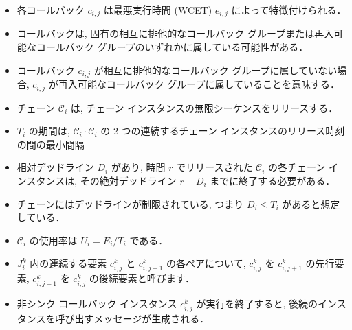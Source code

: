 \begin{frame}{}
    \begin{itemize}
        \item 各コールバック $c_{i, j}$ は最悪実行時間 (WCET) $e_{i, j}$ によって特徴付けられる．
        \item コールバックは, 固有の相互に排他的なコールバック グループまたは再入可能なコールバック グループのいずれかに属している可能性がある．
        \item コールバック $c_{i, j}$ が相互に排他的なコールバック グループに属していない場合, $c_{i, j}$ が再入可能なコールバック グループに属していることを意味する．
    \end{itemize}
\end{frame}

\begin{frame}{}
    \begin{itemize}
        \item チェーン $\mathcal{C}_{i}$ は, チェーン インスタンスの無限シーケンスをリリースする．
        \item $T_{i}$ の期間は, $\mathcal{C}_{i} \cdot \mathcal{C}_{i}$ の 2 つの連続するチェーン インスタンスのリリース時刻の間の最小間隔
        \item 相対デッドライン $D_{i}$ があり, 時間 $r$ でリリースされた $\mathcal{C}_{i}$ の各チェーン インスタンスは, その絶対デッドライン $r+D_{i}$ までに終了する必要がある．
        \item チェーンにはデッドラインが制限されている, つまり $D_{i} \leq T_{i}$ があると想定している．
        \item $\mathcal{C}_{i}$ の使用率は $U_{i}=E_{i} / T_{i}$ である．
    \end{itemize}
\end{frame}

\begin{frame}{}
    \begin{itemize}
        \item $J_{i}^{k}$ 内の連続する要素 $c_{i, j}^{k}$ と $c_{i, j+1}^{k}$ の各ペアについて, $c_{i, j}^{k}$ を $c_{i, j+1}^{k}$ の先行要素, $c_{i, j+1}^{k}$ を $c_{i, j}^{k}$ の後続要素と呼びます．
        \item 非シンク コールバック インスタンス $c_{i, j}^{k}$ が実行を終了すると, 後続のインスタンスを呼び出すメッセージが生成される．
    \end{itemize}
\end{frame}

